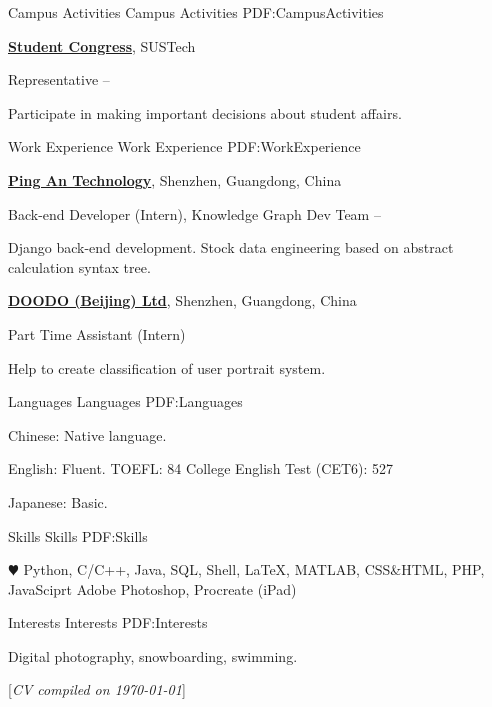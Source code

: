 \documentclass[a4paper,MMMyyyy,nonstopmode]{simpleresumecv}
\newcommand{\CVNote}{CV compiled on {\today}}
\begin{document}
\begin{Body}


\Section
{Campus Activities}
{Campus Activities}
{PDF:CampusActivities}

\Entry
\href{https://www.sustech.edu.cn/en/campus-life.html?lang=en}
{\textbf{Student Congress}},
SUSTech

\Gap
\BulletItem
Representative
\hfill
{} --
\begin{Detail}
\SubBulletItem
Participate in making important decisions about student affairs.
\end{Detail}


\Section
{Work\newline
Experience}
{Work Experience}
{PDF:WorkExperience}

\Entry
\href{https://tech.pingan.com/}
{\textbf{Ping An Technology}},
Shenzhen, Guangdong, China

\Gap
\BulletItem
Back-end Developer (Intern),
Knowledge Graph Dev Team
\hfill
{} --
\begin{Detail}
\SubBulletItem
Django back-end development.
\SubBulletItem
Stock data engineering based on abstract calculation syntax tree.
\end{Detail}

\Entry
\href{https://www.doodod.com/}
{\textbf{DOODO (Beijing) Ltd}},
Shenzhen, Guangdong, China

\Gap
\BulletItem
Part Time Assistant (Intern)
\hfill
{}
\begin{Detail}
\SubBulletItem
Help to create classification of user portrait system.
\end{Detail}


\Section
{Languages}
{Languages}
{PDF:Languages}

\BulletItem
Chinese: Native language.

\Gap
\BulletItem
English: Fluent.
\SubBulletItem
[\DatestampYMD{2020}{12}{06}]
TOEFL: 84
\SubBulletItem
[\DatestampYMD{2019}{06}{01}]
College English Test  (CET6): 527

\Gap
\BulletItem
Japanese: Basic.


\Section
{Skills}
{Skills}
{PDF:Skills}

\Entry
\BulletItem
{\color{black} $\varheart$} Python,
C/C++,
Java,
SQL,
Shell,
{\LaTeX},
MATLAB,
CSS\&HTML,
PHP,
JavaSciprt
\BulletItem
Adobe Photoshop,
Procreate (iPad)


\Section
{Interests}
{Interests}
{PDF:Interests}

\Entry
Digital photography,
snowboarding,
swimming.



\end{Body}


\BigGap
\UseNoteFont%
\null\hfill%
[\textit{\CVNote}]
\end{document}
